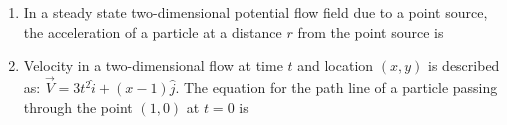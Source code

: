 \documentclass[a4paper,10pt]{article}
\begin{document}
\begin{enumerate}
    \hfill{}
    \begin{enumerate}[label=\Alph*)]
    \end{enumerate}

    \item In a steady state two-dimensional potential flow field due to a point source, the acceleration of a particle at a distance $r$ from the point source is
    
    \hfill{}
    \begin{enumerate}[label=\Alph*)]
    \end{enumerate}

    \item Velocity in a two-dimensional flow at time $t$ and location $(x, y)$ is described as: $\vec{V} = 3t^2 \hat{i} +(x-1)\hat{j}$. The equation for the path line of a particle passing through the point $(1,0)$ at $t=0$ is
    
    \hfill{}
    \begin{enumerate}[label=\Alph*)]
    \end{enumerate}
    

\end{enumerate}
\end{document}
